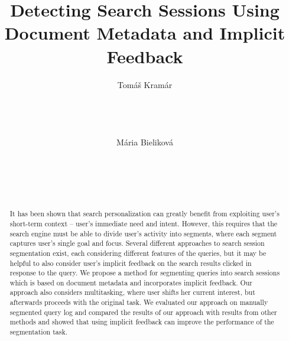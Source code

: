 \documentclass{acm_proc_article-sp} %
\begin{document}
\title{Detecting Search Sessions Using Document Metadata and
	Implicit Feedback}


\author{
\alignauthor
Tomáš Kramár\\
       \\
       \\
       \\
       \\
\alignauthor
Mária Bieliková\\
       \\
       \\
       \\
       \\
}

\maketitle

\begin{abstract}
	
It has been shown that search personalization can greatly
benefit from exploiting user’s short-term context – user’s
immediate need and intent. However, this requires that the
search engine must be able to divide user’s activity into segments,
where each segment captures user’s single goal and
focus. Several different approaches to search session segmentation
exist, each considering different features of the
queries, but it may be helpful to also consider user’s implicit
feedback on the search results clicked in response to
the query. We propose a method for segmenting queries into
search sessions which is based on document metadata and
incorporates implicit feedback. Our approach also considers
multitasking, where user shifts her current interest, but afterwards
proceeds with the original task. We evaluated our
approach on manually segmented query log and compared
the results of our approach with results from other methods
and showed that using implicit feedback can improve the
performance of the segmentation task.

\end{abstract}
\end{document}
